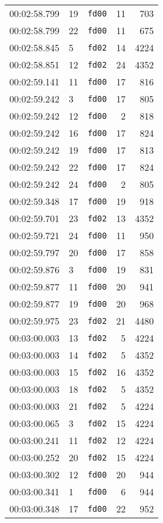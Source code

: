 \documentclass{article}
\begin{document}
\begin{longtable}{lllrr}
00:02:58.799 & 19 & \texttt{fd00} & 11 & 703 \\
00:02:58.799 & 22 & \texttt{fd00} & 11 & 675 \\
00:02:58.845 & 5 & \texttt{fd02} & 14 & 4224 \\
00:02:58.851 & 12 & \texttt{fd02} & 24 & 4352 \\
00:02:59.141 & 11 & \texttt{fd00} & 17 & 816 \\
00:02:59.242 & 3 & \texttt{fd00} & 17 & 805 \\
00:02:59.242 & 12 & \texttt{fd00} & 2 & 818 \\
00:02:59.242 & 16 & \texttt{fd00} & 17 & 824 \\
00:02:59.242 & 19 & \texttt{fd00} & 17 & 813 \\
00:02:59.242 & 22 & \texttt{fd00} & 17 & 824 \\
00:02:59.242 & 24 & \texttt{fd00} & 2 & 805 \\
00:02:59.348 & 17 & \texttt{fd00} & 19 & 918 \\
00:02:59.701 & 23 & \texttt{fd02} & 13 & 4352 \\
00:02:59.721 & 24 & \texttt{fd00} & 11 & 950 \\
00:02:59.797 & 20 & \texttt{fd00} & 17 & 858 \\
00:02:59.876 & 3 & \texttt{fd00} & 19 & 831 \\
00:02:59.877 & 11 & \texttt{fd00} & 20 & 941 \\
00:02:59.877 & 19 & \texttt{fd00} & 20 & 968 \\
00:02:59.975 & 23 & \texttt{fd02} & 21 & 4480 \\
00:03:00.003 & 13 & \texttt{fd02} & 5 & 4224 \\
00:03:00.003 & 14 & \texttt{fd02} & 5 & 4352 \\
00:03:00.003 & 15 & \texttt{fd02} & 16 & 4352 \\
00:03:00.003 & 18 & \texttt{fd02} & 5 & 4352 \\
00:03:00.003 & 21 & \texttt{fd02} & 5 & 4224 \\
00:03:00.065 & 3 & \texttt{fd02} & 15 & 4224 \\
00:03:00.241 & 11 & \texttt{fd02} & 12 & 4224 \\
00:03:00.252 & 20 & \texttt{fd02} & 15 & 4224 \\
00:03:00.302 & 12 & \texttt{fd00} & 20 & 944 \\
00:03:00.341 & 1 & \texttt{fd00} & 6 & 944 \\
00:03:00.348 & 17 & \texttt{fd00} & 22 & 952 \\

\end{longtable}
\end{document}
